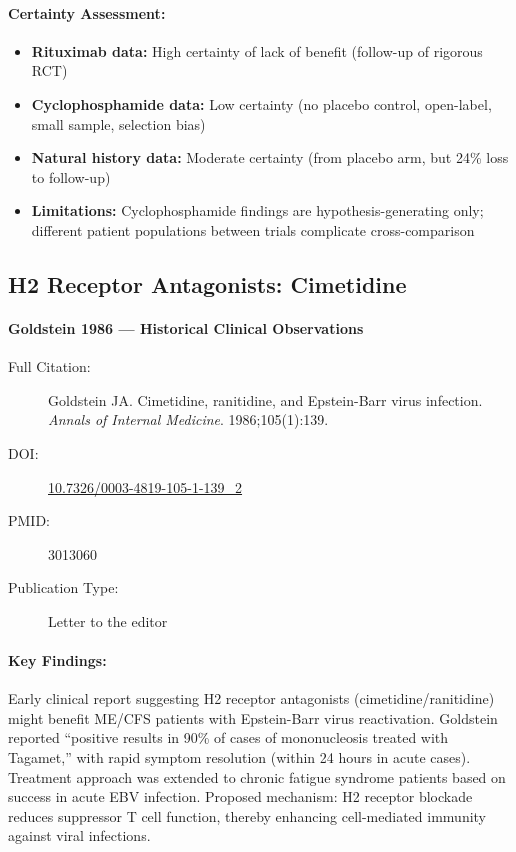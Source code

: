 \paragraph{Certainty Assessment:}
\begin{itemize}
    \item \textbf{Rituximab data:} High certainty of lack of benefit (follow-up of rigorous RCT)
    \item \textbf{Cyclophosphamide data:} Low certainty (no placebo control, open-label, small sample, selection bias)
    \item \textbf{Natural history data:} Moderate certainty (from placebo arm, but 24\% loss to follow-up)
    \item \textbf{Limitations:} Cyclophosphamide findings are hypothesis-generating only; different patient populations between trials complicate cross-comparison
\end{itemize}

\subsection{H2 Receptor Antagonists: Cimetidine}

\paragraph{Goldstein 1986 --- Historical Clinical Observations}

\begin{description}
    \item[Full Citation:] Goldstein JA. Cimetidine, ranitidine, and Epstein-Barr virus infection. \textit{Annals of Internal Medicine}. 1986;105(1):139.
    \item[DOI:] \href{https://doi.org/10.7326/0003-4819-105-1-139_2}{10.7326/0003-4819-105-1-139\_2}
    \item[PMID:] 3013060
    \item[Publication Type:] Letter to the editor
\end{description}

\paragraph{Key Findings:}
Early clinical report suggesting H2 receptor antagonists (cimetidine/ranitidine) might benefit ME/CFS patients with Epstein-Barr virus reactivation. Goldstein reported ``positive results in 90\% of cases of mononucleosis treated with Tagamet,'' with rapid symptom resolution (within 24 hours in acute cases). Treatment approach was extended to chronic fatigue syndrome patients based on success in acute EBV infection. Proposed mechanism: H2 receptor blockade reduces suppressor T cell function, thereby enhancing cell-mediated immunity against viral infections.

